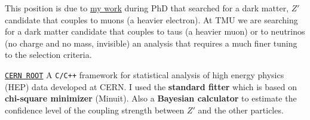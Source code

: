 \documentclass[a4paper]{article}
\begin{document}
\begin{CV}
  This position is due to \href{10.1103/PhysRevD.106.012003}{my work} during
  PhD that searched for a dark matter, $Z'$
  candidate that couples to muons (a heavier electron). At TMU we are searching
  for a dark matter candidate that couples to taus (a heavier muon) or to
  neutrinos (no charge and no mass, invisible) an analysis that requires a much
  finer tuning to the selection criteria.

  \href{https://root.cern}{\texttt{CERN ROOT}} A \texttt{C/C++} framework
  for statistical analysis of high energy physics (HEP) data developed at CERN.
  I used the \textbf{standard fitter} which is based on \textbf{chi-square minimizer} (Minuit).
  Also a \textbf{Bayesian calculator} to estimate the confidence level of the coupling
  strength between $Z'$ and the other particles.







\end{CV}
\end{document}
